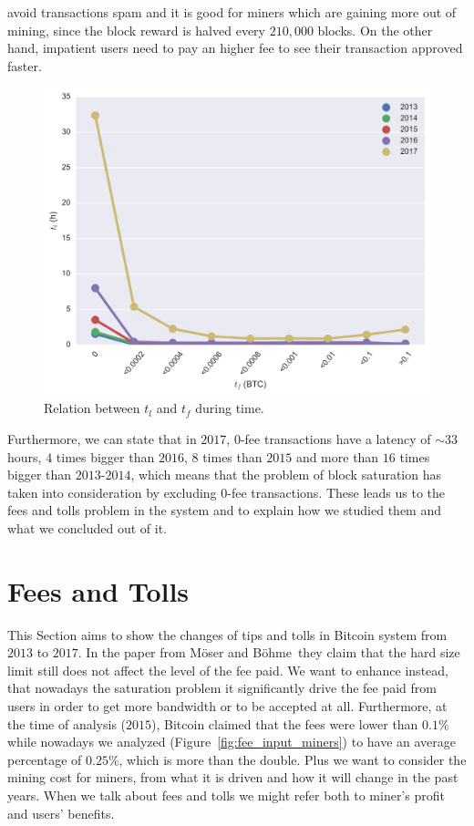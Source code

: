 \documentclass[USenglish]{uit-thesis}
\begin{document}
avoid transactions spam and it is good for miners which are gaining
more out of mining, since the block reward is halved every $210,000$
blocks. On the other hand, impatient users need to pay an higher fee to
see their transaction approved faster.
\begin{figure}[h]
	\centering
	\includegraphics[width=1\textwidth]{img/fee_latency}
	\caption{Relation between $t_l$ and $t_f$ during time.}
	\label{fig:fee_latency}
\end{figure}
Furthermore, we can state that in $2017$,
$0$-fee transactions have a latency of $\sim$$33$\,hours,
$4$ times bigger than $2016$, $8$ times than $2015$
and more than $16$
times bigger than $2013$-$2014$, which means that the problem
of block saturation has taken into consideration by excluding
$0$-fee transactions.
These leads us to the fees and tolls problem in the system and
to explain how we studied them and what we concluded out of it.

\section{Fees and Tolls}
\label{sec:feesandtolls}
This Section aims to show the changes of tips and tolls in Bitcoin
system from $2013$ to $2017$. In the paper from
Möser and Böhme\,\cite{Moser2015} they claim that
the hard size limit still does not affect the level of the fee paid.
We want to enhance instead, that nowadays the saturation
problem it significantly drive the fee paid
from users in order to get more bandwidth
or to be accepted at all. Furthermore, at the time
of analysis ($2015$), Bitcoin claimed that the fees were
lower than $0.1\%$ while nowadays
we analyzed (Figure~\ref{fig:fee_input_miners})
to have an average
percentage of $0.25$\%,
which is more than the double.
Plus we want to consider the mining cost
for miners, from what it is driven and how it will change
in the past years.
When we talk about fees and tolls we might refer both to miner's
profit and users' benefits.
\end{document}

